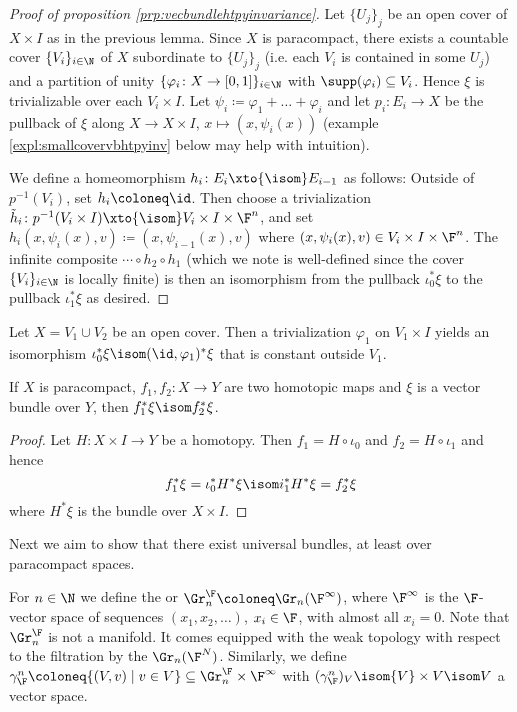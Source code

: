 \begin{proof}[Proof of proposition \ref{prp:vecbundlehtpyinvariance}]
	Let $\{U_j\}_j$ be an open cover of $X \times I$ as in the previous lemma.
	Since $X$ is paracompact, there exists a countable cover $\{V_i\}_{i \in \N}$ of $X$ subordinate to $\{U_j\}_j$ (i.e. each $V_i$ is contained in some $U_j$) and a partition of unity $\{\varphi_i\colon X \to [0, 1]\}_{i \in \N}$ with $\supp(\varphi_i) \subseteq V_i$.
	Hence $\xi$ is trivializable over each $V_i \times I$.
	Let $\psi_i \coloneq \varphi_1 + \ldots + \varphi_i$ and let $p_i\colon E_i \to X$ be the pullback of $\xi$ along $X \to X \times I$, $x \mapsto (x, \psi_i(x))$ (example \ref{expl:smallcovervbhtpyinv} below may help with intuition).

	We define a homeomorphism $h_i\colon E_i \xto{\isom} E_{i - 1}$ as follows:
	Outside of $p^{-1}(V_i)$, set $h_i \coloneq \id$. 
	Then choose a trivialization $\tilde{h}_i\colon p^{-1}(V_i \times I) \xto{\isom} V_i \times I \times \F^n$, and set $h_i(x, \psi_i(x), v) \coloneq (x, \psi_{i - 1}(x), v)$ where $(x, \psi_i(x), v) \in V_i \times I \times \F^n$.
	The infinite composite $\cdots \circ h_2 \circ h_1$ (which we note is well-defined since the cover $\{V_i\}_{i \in \N}$ is locally finite) is then an isomorphism from the pullback $\iota_0^* \xi$ to the pullback $\iota_1^* \xi$ as desired.
\end{proof}
\begin{example}\label{expl:smallcovervbhtpyinv}
	Let $X = V_1 \cup V_2$ be an open cover.
	Then a trivialization $\varphi_1$ on $V_1 \times I$ yields an isomorphism $\iota_0^* \xi \isom (\id, \varphi_1)^* \xi$ that is constant outside $V_1$.
\end{example}
\begin{corollary}
	If $X$ is paracompact, $f_1, f_2\colon X \to Y$ are two homotopic maps and $\xi$ is a vector bundle over $Y$, then $f_1^* \xi \isom f_2^* \xi$.
\end{corollary}
\begin{proof}
	Let $H\colon X \times I \to Y$ be a homotopy.
	Then $f_1 = H \circ \iota_0$ and $f_2 = H \circ \iota_1$ and hence
	\begin{equation*}
		f_1^* \xi = \iota_0^* H^* \xi \isom i_1^* H^* \xi = f_2^* \xi
	\end{equation*}
	where $H^* \xi$ is the bundle over $X \times I$.
\end{proof}
Next we aim to show that there exist universal bundles, at least over paracompact spaces.
\begin{definition}
	For $n \in \N$ we define the  or  $\Gr_n^{\F} \coloneq \Gr_n(\F^\infty)$, where $\F^\infty$ is the $\F$-vector space of sequences $(x_1, x_2, \ldots)$, $x_i \in \F$, with almost all $x_i = 0$.
	Note that $\Gr_n^{\F}$ is not a manifold.
	It comes equipped with the weak topology with respect to the filtration by the $\Gr_n(\F^N)$.
	Similarly, we define $\gamma_{\F}^n \coloneq \{(V, v) \mid v \in V\} \subseteq \Gr_n^{\F} \times \F^\infty$ with $(\gamma_{\F}^n)_V \isom \{V\} \times V \isom V$ a vector space.
\end{definition}
